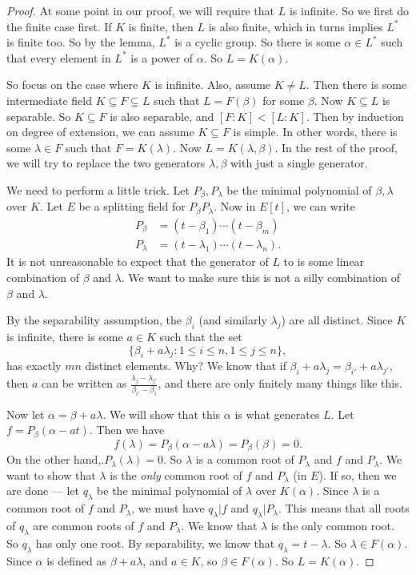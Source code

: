 \documentclass[a4paper]{article}
\begin{document}
\begin{proof}
  At some point in our proof, we will require that $L$ is infinite. So we first do the finite case first. If $K$ is finite, then $L$ is also finite, which in turns implies $L^*$ is finite too. So by the lemma, $L^*$ is a cyclic group. So there is some $\alpha \in L^*$ such that every element in $L^*$ is a power of $\alpha$. So $L = K(\alpha)$.

  So focus on the case where $K$ is infinite. Also, assume $K \not= L$. Then there is some intermediate field $K\subseteq F\subsetneq L$ such that $L = F(\beta)$ for some $\beta$. Now $K\subseteq L$ is separable. So $K\subseteq F$ is also separable, and $[F:K] < [L:K]$. Then by induction on degree of extension, we can assume $K\subseteq F$ is simple. In other words, there is some $\lambda \in F$ such that $F = K(\lambda)$. Now $L = K(\lambda, \beta)$. In the rest of the proof, we will try to replace the two generators $\lambda, \beta$ with just a single generator.

  We need to perform a little trick. Let $P_\beta, P_\lambda$ be the minimal polynomial of $\beta, \lambda$ over $K$. Let $E$ be a splitting field for $P_\beta P_\lambda$. Now in $E[t]$, we can write
  \begin{align*}
    P_\beta &= (t - \beta_1)\cdots (t - \beta_m)\\
    P_\lambda &= (t - \lambda_1) \cdots (t - \lambda_n).
  \end{align*}
  It is not unreasonable to expect that the generator of $L$ to is some linear combination of $\beta$ and $\lambda$. We want to make sure this is not a silly combination of $\beta$ and $\lambda$.

  By the separability assumption, the $\beta_i$ (and similarly $\lambda_j$) are all distinct. Since $K$ is infinite, there is some $a \in K$ such that the set
  \[
    \{\beta_i + a \lambda_j: 1 \leq i \leq n, 1 \leq j \leq n\},
  \]
  has exactly $mn$ distinct elements. Why? We know that if $\beta_i + a \lambda_j = \beta_{i'} + a \lambda_{j'}$, then $a$ can be written as $\frac{\lambda_j - \lambda_{j'}}{\beta_{i'} - \beta_i}$, and there are only finitely many things like this.

  Now let $\alpha = \beta + a \lambda$. We will show that this $\alpha$ is what generates $L$. Let $f = P_\beta(\alpha - at)$. Then we have
  \[
    f(\lambda) = P_\beta(\alpha - a\lambda) = P_\beta(\beta) = 0.
  \]
  On the other hand,.$P_\lambda(\lambda) = 0$. So $\lambda$ is a common root of $P_\lambda$ and $f$ and $P_\lambda$. We want to show that $\lambda$ is the \emph{only} common root of $f$ and $P_\lambda$ (in $E$). If so, then we are done --- let $q_\lambda$ be the minimal polynomial of $\lambda$ over $K(\alpha)$. Since $\lambda$ is a common root of $f$ and $P_\lambda$, we must have $q_\lambda | f$ and $q_\lambda | P_\lambda$. This means that all roots of $q_\lambda$ are common roots of $f$ and $P_\lambda$. We know that $\lambda$ is the only common root. So $q_\lambda$ has only one root. By separability, we know that $q_\lambda = t - \lambda$. So $\lambda \in F(\alpha)$. Since $\alpha$ is defined as $\beta + a \lambda$, and $a \in K$, so $\beta\in F(\alpha)$. So $L = K(\alpha)$.


\end{proof}
\end{document}
